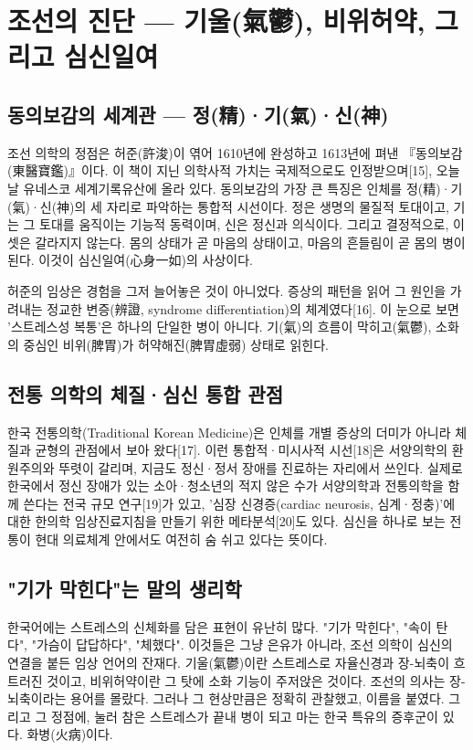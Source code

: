 \documentclass[12pt,oneside]{book}
\begin{document}
\section{조선의 진단 — 기울(氣鬱), 비위허약, 그리고 심신일여}

\subsection{동의보감의 세계관 — 정(精)·기(氣)·신(神)}

조선 의학의 정점은 허준(許浚)이 엮어 1610년에 완성하고 1613년에 펴낸 『동의보감(東醫寶鑑)』이다. 이 책이 지닌 의학사적 가치는 국제적으로도 인정받으며[15], 오늘날 유네스코 세계기록유산에 올라 있다. 동의보감의 가장 큰 특징은 인체를 정(精)·기(氣)·신(神)의 세 자리로 파악하는 통합적 시선이다. 정은 생명의 물질적 토대이고, 기는 그 토대를 움직이는 기능적 동력이며, 신은 정신과 의식이다. 그리고 결정적으로, 이 셋은 갈라지지 않는다. 몸의 상태가 곧 마음의 상태이고, 마음의 흔들림이 곧 몸의 병이 된다. 이것이 심신일여(心身一如)의 사상이다.

허준의 임상은 경험을 그저 늘어놓은 것이 아니었다. 증상의 패턴을 읽어 그 원인을 가려내는 정교한 변증(辨證, syndrome differentiation)의 체계였다[16]. 이 눈으로 보면 '스트레스성 복통'은 하나의 단일한 병이 아니다. 기(氣)의 흐름이 막히고(氣鬱), 소화의 중심인 비위(脾胃)가 허약해진(脾胃虛弱) 상태로 읽힌다.

\subsection{전통 의학의 체질·심신 통합 관점}

한국 전통의학(Traditional Korean Medicine)은 인체를 개별 증상의 더미가 아니라 체질과 균형의 관점에서 보아 왔다[17]. 이런 통합적·미시사적 시선[18]은 서양의학의 환원주의와 뚜렷이 갈리며, 지금도 정신·정서 장애를 진료하는 자리에서 쓰인다. 실제로 한국에서 정신 장애가 있는 소아·청소년의 적지 않은 수가 서양의학과 전통의학을 함께 쓴다는 전국 규모 연구[19]가 있고, '심장 신경증(cardiac neurosis, 심계·정충)'에 대한 한의학 임상진료지침을 만들기 위한 메타분석[20]도 있다. 심신을 하나로 보는 전통이 현대 의료체계 안에서도 여전히 숨 쉬고 있다는 뜻이다.

\subsection{"기가 막힌다"는 말의 생리학}

한국어에는 스트레스의 신체화를 담은 표현이 유난히 많다. "기가 막힌다", "속이 탄다", "가슴이 답답하다", "체했다". 이것들은 그냥 은유가 아니라, 조선 의학이 심신의 연결을 붙든 임상 언어의 잔재다. 기울(氣鬱)이란 스트레스로 자율신경과 장-뇌축이 흐트러진 것이고, 비위허약이란 그 탓에 소화 기능이 주저앉은 것이다. 조선의 의사는 장-뇌축이라는 용어를 몰랐다. 그러나 그 현상만큼은 정확히 관찰했고, 이름을 붙였다. 그리고 그 정점에, 눌러 참은 스트레스가 끝내 병이 되고 마는 한국 특유의 증후군이 있다. 화병(火病)이다.
\end{document}
